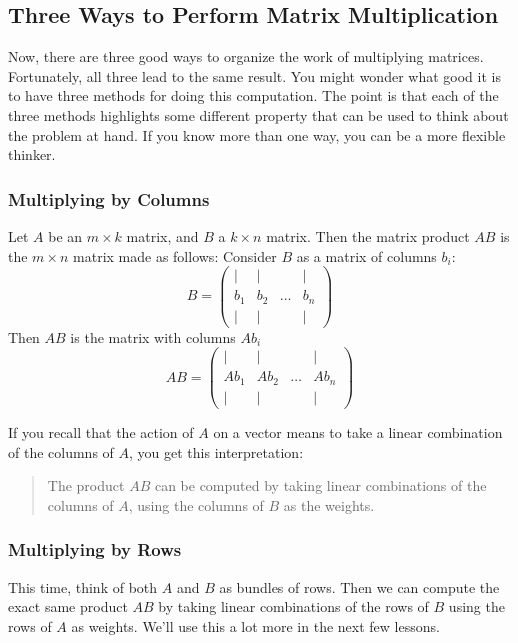 \documentclass[elementsmain.tex]{subfiles}
\begin{document}
\subsection*{Three Ways to Perform Matrix Multiplication}

Now, there are three good ways to organize the work of multiplying matrices. Fortunately, all three lead to the same result. You might wonder what good it is to have three methods for doing this computation. The point is that each of the three methods highlights some different property that can be used to think about the problem at hand. If you know more than one way, you can be a more flexible thinker.

\subsubsection*{Multiplying by Columns}


\begin{definition}
Let $A$ be an $m\times k$ matrix, and $B$ a $k\times n$ matrix. Then the matrix product $AB$ is the $m\times n$ matrix made as follows: Consider $B$ as a matrix of columns $b_i$:
\[
B = \begin{pmatrix} | & | & & | \\ b_1 & b_2 & \dots & b_n \\  | & | & & | \end{pmatrix}
\]
Then $AB$ is the matrix with columns $Ab_i$
\[
AB = \begin{pmatrix} | & | & & | \\ Ab_1 & Ab_2 & \dots & Ab_n \\  | & | & & | \end{pmatrix}
\]
\end{definition}


If you recall that the action of $A$ on a vector means to take a linear combination of the columns of $A$, you get this interpretation:
\begin{quote}
The product $AB$ can be computed by taking linear combinations of the columns of $A$, using the columns of $B$ as the weights.
\end{quote}

\subsubsection*{Multiplying by Rows}

This time, think of both $A$ and $B$ as bundles of rows. Then we can compute the exact same product $AB$ by taking linear combinations of the rows of $B$ using the rows of $A$ as weights. We'll use this a lot more in the next few lessons.
\end{document}
